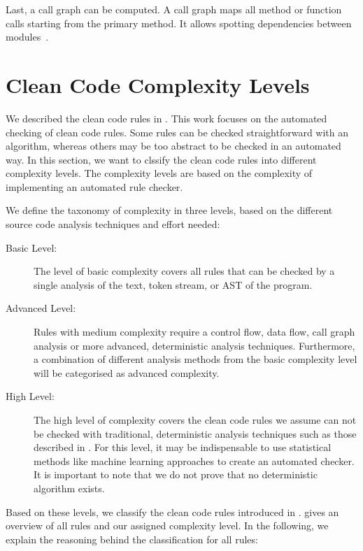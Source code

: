 Last, a call graph can be computed. A call graph maps all method or function calls starting from the primary method. It allows spotting dependencies between modules~\cite{prahofer_static_2017}.

\section{Clean Code Complexity Levels}\label{sec:cc_complexity_levels}
We described the clean code rules in . This work focuses on the automated checking of clean code rules. Some rules can be checked straightforward with an algorithm, whereas others may be too abstract to be checked in an automated way. In this section, we want to clssify the clean code rules into different complexity levels. The complexity levels are based on the complexity of implementing an automated rule checker. 

We define the taxonomy of complexity in three levels, based on the different source code analysis techniques and effort needed:
\begin{description}
    \item[Basic Level:] The level of basic complexity covers all rules that can be checked by a single analysis of the text, token stream, or AST of the program.
    \item[Advanced Level:] Rules with medium complexity require a control flow, data flow, call graph analysis or more advanced, deterministic analysis techniques. Furthermore, a combination of different analysis methods from the basic complexity level will be categorised as advanced complexity. 
    \item[High Level:] The high level of complexity covers the clean code rules we assume can not be checked with traditional, deterministic analysis techniques such as those described in . For this level, it may be indispensable to use statistical methods like machine learning approaches to create an automated checker. It is important to note that we do not prove that no deterministic algorithm exists. 
\end{description}

Based on these levels, we classify the clean code rules introduced in .  gives an overview of all rules and our assigned complexity level. In the following, we explain the reasoning behind the classification for all rules:


